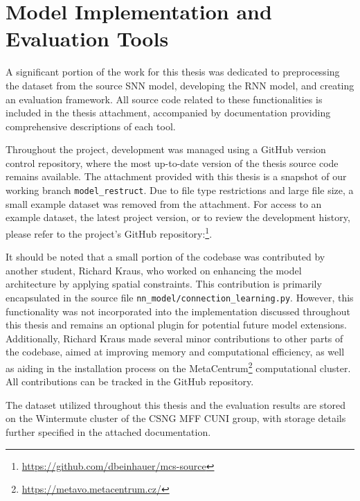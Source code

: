 \chapter{Model Implementation and Evaluation Tools}
A significant portion of the work for this thesis was dedicated to preprocessing the dataset from the source SNN model, developing the RNN model, and creating an evaluation framework. All source code related to these functionalities is included in the thesis attachment, accompanied by documentation providing comprehensive descriptions of each tool.

Throughout the project, development was managed using a GitHub version control repository, where the most up-to-date version of the thesis source code remains available. The attachment provided with this thesis is a snapshot of our working branch \verb|model_restruct|. Due to file type restrictions and large file size, a small example dataset was removed from the attachment. For access to an example dataset, the latest project version, or to review the development history, please refer to the project's GitHub repository:\footnote{\url{https://github.com/dbeinhauer/mcs-source}}.

It should be noted that a small portion of the codebase was contributed by another student, Richard Kraus, who worked on enhancing the model architecture by applying spatial constraints. This contribution is primarily encapsulated in the source file \verb|nn_model/connection_learning.py|. However, this functionality was not incorporated into the implementation discussed throughout this thesis and remains an optional plugin for potential future model extensions. Additionally, Richard Kraus made several minor contributions to other parts of the codebase, aimed at improving memory and computational efficiency, as well as aiding in the installation process on the MetaCentrum\footnote{\url{https://metavo.metacentrum.cz/}} computational cluster. All contributions can be tracked in the GitHub repository.

The dataset utilized throughout this thesis and the evaluation results are stored on the Wintermute cluster of the CSNG MFF CUNI group, with storage details further specified in the attached documentation.

